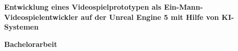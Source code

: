 \begin{titlepage}
	\begin{center}
		\vspace{1cm}
		
		\Huge
		\textbf{Entwicklung eines Videospielprototypen als \glqq Ein-Mann-Videospielentwickler\grqq{} auf der Unreal Engine 5 mit Hilfe von KI-Systemen}
		
		\vspace{2.5 cm}
		\Large
		\textbf{Bachelorarbeit}
		
		
		
		
	\end{center}
	
	
	
	
\end{titlepage}